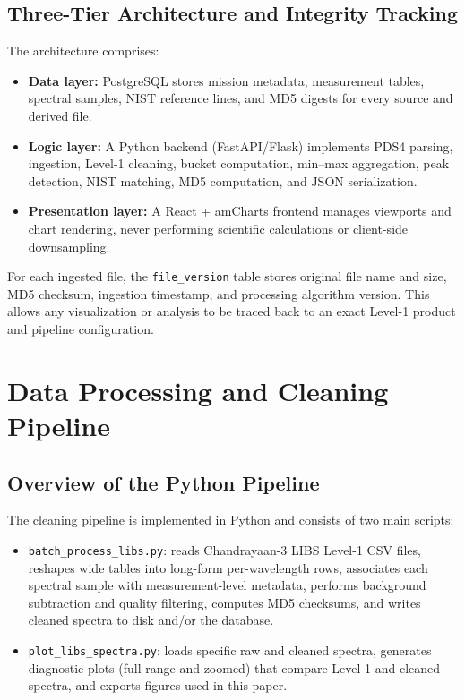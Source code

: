 \documentclass[12pt,a4paper]{article}
\begin{document}
\subsection{Three-Tier Architecture and Integrity Tracking}

The architecture comprises:

\begin{itemize}[nosep]
  \item \textbf{Data layer:} PostgreSQL stores mission metadata, measurement tables, spectral samples, NIST reference lines, and MD5 digests for every source and derived file.
  \item \textbf{Logic layer:} A Python backend (FastAPI/Flask) implements PDS4 parsing, ingestion, Level-1 cleaning, bucket computation, min--max aggregation, peak detection, NIST matching, MD5 computation, and JSON serialization.\cite{FastAPIweb}
  \item \textbf{Presentation layer:} A React + amCharts frontend manages viewports and chart rendering, never performing scientific calculations or client-side downsampling.\cite{amChartsWeb}
\end{itemize}

For each ingested file, the \texttt{file\_version} table stores original file name and size, MD5 checksum, ingestion timestamp, and processing algorithm version. This allows any visualization or analysis to be traced back to an exact Level-1 product and pipeline configuration.

\section{Data Processing and Cleaning Pipeline}
\label{sec:processing}

\subsection{Overview of the Python Pipeline}

The cleaning pipeline is implemented in Python and consists of two main scripts:

\begin{itemize}[nosep]
  \item \texttt{batch\_process\_libs.py}: reads Chandrayaan-3 LIBS Level-1 CSV files, reshapes wide tables into long-form per-wavelength rows, associates each spectral sample with measurement-level metadata, performs background subtraction and quality filtering, computes MD5 checksums, and writes cleaned spectra to disk and/or the database.
  \item \texttt{plot\_libs\_spectra.py}: loads specific raw and cleaned spectra, generates diagnostic plots (full-range and zoomed) that compare Level-1 and cleaned spectra, and exports figures used in this paper.
\end{itemize}
\end{document}
